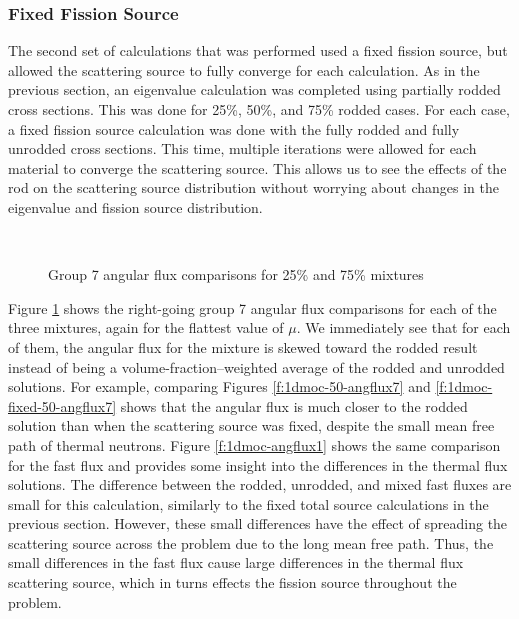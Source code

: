 \subsubsection{Fixed Fission Source}

The second set of calculations that was performed used a fixed fission source, but allowed the scattering source to fully converge for each calculation.  As in the previous section, an eigenvalue calculation was completed using partially rodded cross sections.  This was done for 25\%, 50\%, and 75\% rodded cases.  For each case, a fixed fission source calculation was done with the fully rodded and fully unrodded cross sections.  This time, multiple iterations were allowed for each material to converge the scattering source.  This allows us to see the effects of the rod on the scattering source distribution without worrying about changes in the eigenvalue and fission source distribution.

\begin{figure}[h]
    \centering
    \hfill
    ~
    \caption{Group 7 angular flux comparisons for 25\% and 75\% mixtures}\label{f:1dmoc-angflux7}
\end{figure}


Figure \ref{f:1dmoc-angflux7} shows the right-going group 7 angular flux comparisons for each of the three mixtures, again for the flattest value of $\mu$.  We immediately see that for each of them, the angular flux for the mixture is skewed toward the rodded result instead of being a volume-fraction--weighted average of the rodded and unrodded solutions.  For example, comparing Figures \ref{f:1dmoc-50-angflux7} and \ref{f:1dmoc-fixed-50-angflux7} shows that the angular flux is much closer to the rodded solution than when the scattering source was fixed, despite the small mean free path of thermal neutrons.  Figure \ref{f:1dmoc-angflux1} shows the same comparison for the fast flux and provides some insight into the differences in the thermal flux solutions.  The difference between the rodded, unrodded, and mixed fast fluxes are small for this calculation, similarly to the fixed total source calculations in the previous section.  However, these small differences have the effect of spreading the scattering source across the problem due to the long mean free path.  Thus, the small differences in the fast flux cause large differences in the thermal flux scattering source, which in turns effects the fission source throughout the problem.

